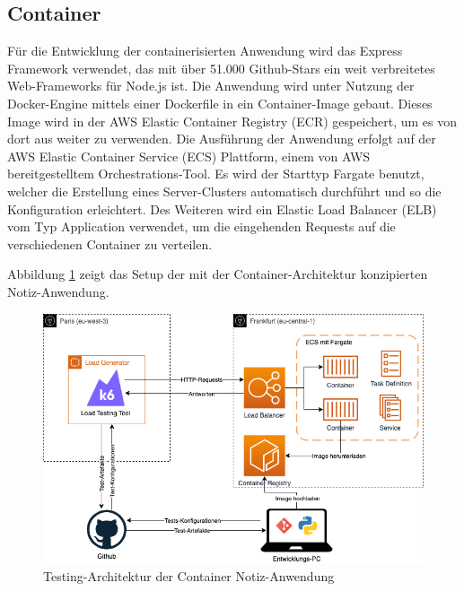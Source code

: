 \subsection{Container}
Für die Entwicklung der containerisierten Anwendung wird das Express Framework verwendet, das mit über 51.000 Github-Stars ein weit verbreitetes Web-Frameworks für Node.js ist\cite{noauthor_expressjsexpress_2021}. Die Anwendung wird unter Nutzung der Docker-Engine mittels einer Dockerfile in ein Container-Image gebaut. Dieses Image wird in der AWS Elastic Container Registry (ECR) gespeichert, um es von dort aus weiter zu verwenden. 
Die Ausführung der Anwendung erfolgt auf der AWS Elastic Container Service (ECS) Plattform, einem von AWS bereitgestelltem Orchestrations-Tool. Es wird der Starttyp Fargate benutzt, welcher die Erstellung eines Server-Clusters automatisch durchführt und so die Konfiguration erleichtert. Des Weiteren wird ein Elastic Load Balancer (ELB) vom Typ Application verwendet, um die eingehenden Requests auf die verschiedenen Container zu verteilen. 

Abbildung \ref{fig:fargate-testing-architektur} zeigt das Setup der mit der Container-Architektur konzipierten Notiz-Anwendung.

\begin{figure}[H]
    \includegraphics[width=\textwidth]{img/fargate-testing-architektur.png}
    \caption[Testing-Architektur der Container Notiz-Anwendung]{Testing-Architektur der Container Notiz-Anwendung}
    \label{fig:fargate-testing-architektur}
\end{figure}

